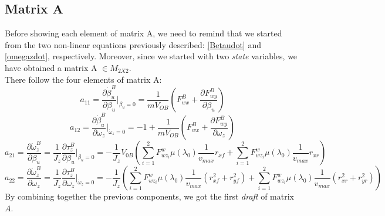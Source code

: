\subsection{Matrix $\mathbf{A}$}
	Before showing each element of matrix A, we  need to remind that we started from the two non-linear equations previously described: \ref{Betaudot} and \ref{omegazdot}, respectively. Moreover, since we started with two \textit{state} variables, we have obtained a matrix A $\in M_{2X2}$.\\ There follow the four elements of matrix A:
		\begin{equation} \label{a11}
			a_{11} = \frac{\partial\dot{\beta}_{u}^{B}}{\partial\beta_{u}}\vert_{\beta_{u}=0}  = \frac{1}{mV_{OB}}(F_{wx}^{B} + \frac{\partial F_{wy}^{B}}{\partial\beta_{u}})
		\end{equation}
		\begin{equation} \label{a12}
			a_{12} = \frac{\partial\dot{\beta}_{u}^{B}}{\partial\omega_{z}}\vert_{\dot\omega_{z}=0} = -1 + \frac{1}{mV_{OB}} (F_{wx}^{B} + \frac{\partial F_{wy}^{B}}{\partial\omega_{z}})
		\end{equation}
		\begin{equation} \label{a21}
			a_{21} = \frac{\partial\dot{\omega}_{z}^{B}}{\partial\beta_{u}} = \frac{1}{J_{z}} \frac{\partial\tau_{z}^{B}}{\partial\beta_{u}} \vert_{\beta_{u}=0} = -\frac{1}{J_{z}} V_{0B} (\sum\limits_{i=1}^2 F_{wz_{i}}^{w} \mu(\lambda_{0}) \frac{1}{v_{max}}r_{xf} + \sum\limits_{i=1}^2 F_{wz_{i}}^{w} \mu(\lambda_{0}) \frac{1}{v_{max}}r_{xr})
		\end{equation}
		\begin{equation} \label{a22}
			a_{22} = \frac{\partial\dot{\omega}_{z}^{B}}{\partial\omega_{z}} = \frac{1}{J_{z}} \frac{\partial\tau_{z}^{B}}{\partial\omega_{z}}\vert_{\dot\omega_{z}=0} = -\frac{1}{J_{z}}(\sum\limits_{i=1}^2 F_{wz_{i}}^{w} \mu(\lambda_{0}) \frac{1}{v_{max}} (r_{xf}^{2} + r_{yf}^{2}) + \sum\limits_{i=1}^2 F_{wz_{i}}^{w} \mu(\lambda_{0}) \frac{1}{v_{max}} (r_{xr}^{2} + r_{yr}^{2}))
		\end{equation}
	By combining together the previous components, we got the first  \textit{draft} of matrix $A$.

